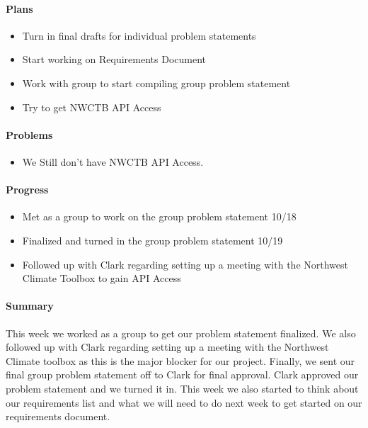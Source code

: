 \documentclass[onecolumn, draftclsnofoot,10pt, compsoc]{article}
\begin{document}
		    \paragraph{Plans} \hfill \break

		        \begin{itemize}
		            \item Turn in final drafts for individual problem statements
		            \item Start working on Requirements Document
		            \item Work with group to start compiling group problem statement
		            \item Try to get NWCTB API Access
		        \end{itemize}

		    \paragraph{Problems} \hfill \break

		        \begin{itemize}
		            \item We Still don't have NWCTB API Access.
		        \end{itemize}

		    \paragraph{Progress} \hfill \break

		        \begin{itemize}
		            \item Met as a group to work on the group problem statement 10/18
		            \item Finalized and turned in the group problem statement 10/19
		            \item Followed up with Clark regarding setting up a meeting with the Northwest Climate Toolbox to gain API Access
		        \end{itemize}

		        \paragraph{Summary}
		            This week we worked as a group to get our problem statement finalized. We also followed up with Clark regarding setting up a meeting with the Northwest Climate toolbox as this is the major blocker for our project. Finally, we sent our final group problem statement off to Clark for final approval. Clark approved our problem statement and we turned it in. This week we also started to think about our requirements list and what we will need to do next week to get started on our requirements document.\\
\end{document}
